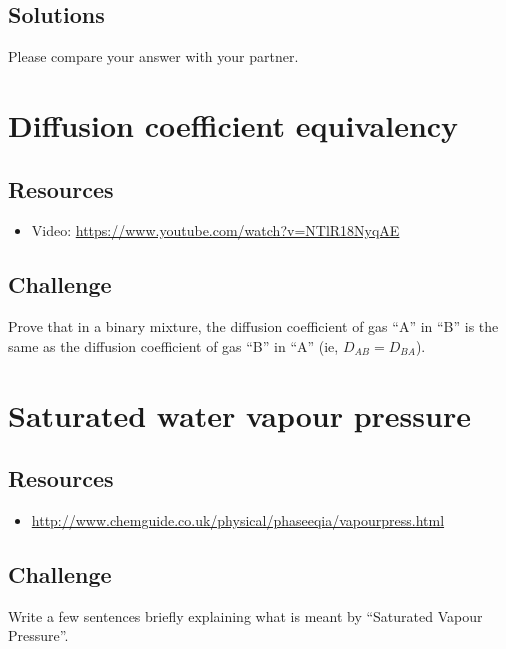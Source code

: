 \subsection*{Solutions}
Please compare your answer with your partner.




\newpage
\section{Diffusion coefficient equivalency}

\subsection*{Resources}
\begin{itemize}
    \item Video: \url{https://www.youtube.com/watch?v=NTlR18NyqAE}
\end{itemize}

\subsection*{Challenge}
Prove that in a binary mixture, the diffusion coefficient of gas ``A'' in ``B'' is the same as the diffusion coefficient of gas ``B'' in ``A'' (ie, $D_{AB} = D_{BA}$).




\newpage
\section{Saturated water vapour pressure}

\subsection*{Resources}
\begin{itemize}
    \item \url{http://www.chemguide.co.uk/physical/phaseeqia/vapourpress.html}
\end{itemize}

\subsection*{Challenge}
Write a few sentences briefly explaining what is meant by ``Saturated Vapour Pressure''.


